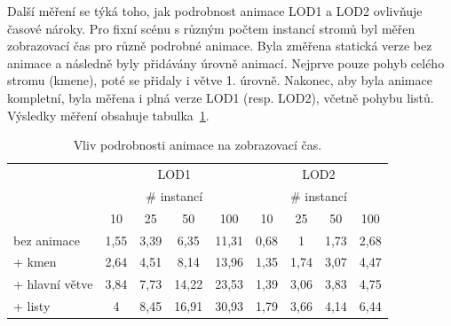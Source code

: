 Další měření se týká toho, jak podrobnost animace LOD1 a LOD2 ovlivňuje časové nároky. Pro fixní scénu s různým počtem instancí stromů byl měřen zobrazovací čas pro různě podrobné animace. Byla změřena statická verze bez animace a následně byly přidávány úrovně animací. Nejprve pouze pohyb celého stromu (kmene), poté se přidaly i větve 1. úrovně. Nakonec, aby byla animace kompletní, byla měřena i plná verze LOD1 (resp. LOD2), včetně pohybu listů.
Výsledky měření obsahuje tabulka~\ref{table:lod12-anim}.
\begin{table}[!hbt]
\centering
\begin{tabular}{|l | c | c | c | c || c | c | c | c |} 
\hline 
		&\multicolumn{4}{c||}{LOD1}		&\multicolumn{4}{c|}{LOD2}\\	
		&\multicolumn{4}{c||}{\# instancí}	&\multicolumn{4}{c|}{\# instancí}\\
			&10		&25		&50		&100	&10		&25		&50		&100\\
\hline					
bez animace	&1,55	&3,39	&6,35	&11,31	&0,68	&1		&1,73	&2,68 \\
+ kmen		&2,64	&4,51	&8,14	&13,96	&1,35	&1,74	&3,07	&4,47\\
+ hlavní větve	&3,84	&7,73	&14,22	&23,53	&1,39	&3,06	&3,83	&4,75\\
+ listy			&4		&8,45	&16,91	&30,93	&1,79	&3,66	&4,14	&6,44\\
[1ex] 
\hline 
\end{tabular}
\caption{Vliv podrobnosti animace na zobrazovací čas. \label{table:lod12-anim}}
\end{table}

